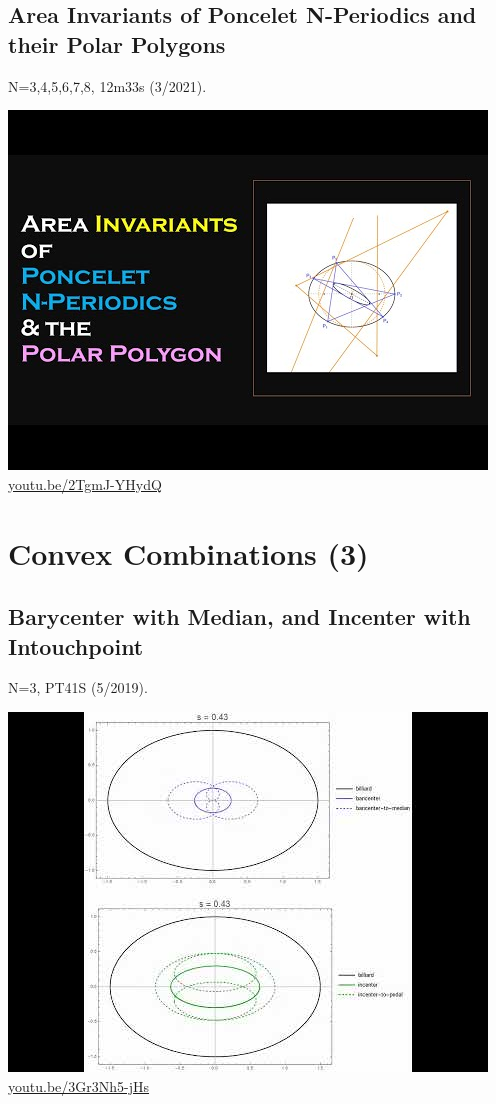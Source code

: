 \documentclass[12pt]{amsart}
\begin{document}
\subsection{Area Invariants of Poncelet N-Periodics and their Polar Polygons}
\label{vid:2TgmJ-YHydQ}
\noindent N=3,4,5,6,7,8, 12m33s (3/2021). 
\begin{center}\includegraphics[width=.5\textwidth]{pics/2TgmJ-YHydQ.jpg} \\ 
\href{https://youtu.be/2TgmJ-YHydQ}{\url{youtu.be/2TgmJ-YHydQ}}\end{center}
% 

\section{Convex Combinations (3)}

\subsection{Barycenter with Median, and Incenter with Intouchpoint}
\label{vid:3Gr3Nh5-jHs}
\noindent N=3, PT41S (5/2019). 
\begin{center}\includegraphics[width=.5\textwidth]{pics/3Gr3Nh5-jHs.jpg} \\ 
\href{https://youtu.be/3Gr3Nh5-jHs}{\url{youtu.be/3Gr3Nh5-jHs}}\end{center}
% 
\end{document}
